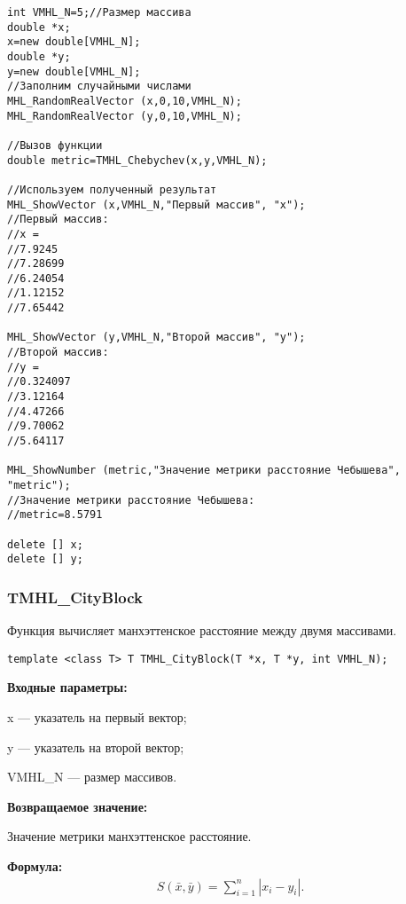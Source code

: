 \documentclass[a4paper,12pt]{article}
\begin{document}
\begin{lstlisting}[label=code_use_TMHL_Chebychev,caption=Пример использования]
int VMHL_N=5;//Размер массива
double *x;
x=new double[VMHL_N];
double *y;
y=new double[VMHL_N];
//Заполним случайными числами
MHL_RandomRealVector (x,0,10,VMHL_N);
MHL_RandomRealVector (y,0,10,VMHL_N);

//Вызов функции
double metric=TMHL_Chebychev(x,y,VMHL_N);

//Используем полученный результат
MHL_ShowVector (x,VMHL_N,"Первый массив", "x");
//Первый массив:
//x =	
//7.9245
//7.28699
//6.24054
//1.12152
//7.65442

MHL_ShowVector (y,VMHL_N,"Второй массив", "y");
//Второй массив:
//y =	
//0.324097
//3.12164
//4.47266
//9.70062
//5.64117

MHL_ShowNumber (metric,"Значение метрики расстояние Чебышева", "metric");
//Значение метрики расстояние Чебышева:
//metric=8.5791

delete [] x;
delete [] y;
\end{lstlisting}

\subsubsection{TMHL\_CityBlock}\label{TMHL_CityBlock}

Функция вычисляет манхэттенское расстояние между двумя массивами.


\begin{lstlisting}[label=code_syntax_TMHL_CityBlock,caption=Синтаксис]
template <class T> T TMHL_CityBlock(T *x, T *y, int VMHL_N);
\end{lstlisting}

\textbf{Входные параметры:}
 
x --- указатель на первый вектор;
 
y --- указатель на второй вектор;
 
VMHL\_N --- размер массивов.

\textbf{Возвращаемое значение:}
 
Значение метрики манхэттенское расстояние.

\textbf{Формула:}
\begin{eqnarray*}
S\left( \bar{x}, \bar{y}\right)=\sum_{i=1}^n \left|x_i-y_i \right|  .
\end{eqnarray*}
\end{document}
